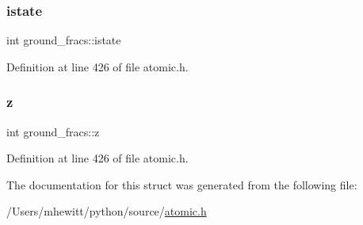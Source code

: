 \subsubsection{\texorpdfstring{istate}{istate}}
{\footnotesize\ttfamily int ground\+\_\+fracs\+::istate}



Definition at line 426 of file atomic.\+h.

\mbox{\label{structground__fracs_ae8df1c2f77e5817ae6e30708517be5ab}} 
\subsubsection{\texorpdfstring{z}{z}}
{\footnotesize\ttfamily int ground\+\_\+fracs\+::z}



Definition at line 426 of file atomic.\+h.



The documentation for this struct was generated from the following file\+:\begin{DoxyCompactItemize}
\item 
/\+Users/mhewitt/python/source/\hyperlink{atomic_8h}{atomic.\+h}\end{DoxyCompactItemize}
